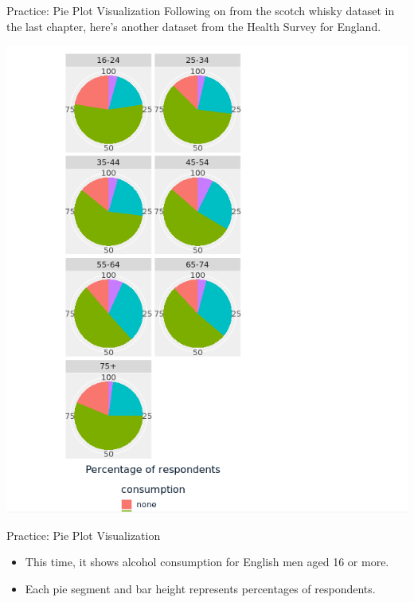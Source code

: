\documentclass[
  ignorenonframetext,
]{beamer}
\begin{document}
\begin{frame}{Practice: Pie Plot Visualization}
\label{practice-pie-plot-visualization-1}
Following on from the scotch whisky dataset in the last chapter, here's
another dataset from the Health Survey for England.

\includegraphics{../images/im106.png}
\end{frame}

\begin{frame}{Practice: Pie Plot Visualization}
\label{practice-pie-plot-visualization-2}
\begin{itemize}
\item
  This time, it shows alcohol consumption for English men aged 16 or
  more.
\item
  Each pie segment and bar height represents percentages of respondents.
\end{itemize}
\end{frame}
\end{document}
